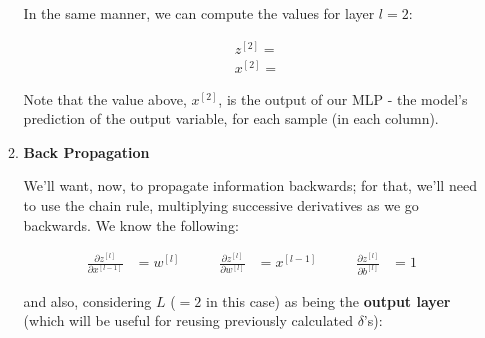 \documentclass[12pt]{article}
\begin{document}
\begin{enumerate}[leftmargin=\labelsep]
\begin{enumerate}
                In the same manner, we can compute the values for layer $l = 2$:

                \begin{equation*}
                  \begin{aligned}
                     & z^{[2]} =  \\
                     & x^{[2]} = 
                  \end{aligned}
                \end{equation*}

                Note that the value above, $x^{[2]}$, is the output of our MLP - the model's
                prediction of the output variable, for each sample (in each column).

                \pagebreak

          \item \textbf{Back Propagation}

                We'll want, now, to propagate information backwards; for that, we'll need to use
                the chain rule, multiplying successive derivatives as we go backwards.
                We know the following:

                \begin{equation*}
                  \begin{aligned}
                    \frac{\partial z^{[l]}}{\partial x^{[l - 1]}} & = w^{[l]}     & \qquad
                    \frac{\partial z^{[l]}}{\partial w^{[l]}}     & = x^{[l - 1]} & \qquad
                    \frac{\partial z^{[l]}}{\partial b^{[l]}}     & = 1
                  \end{aligned}
                \end{equation*}

                \vskip 0.5cm

                and also, considering $L$ ($=2$ in this case) as being the \textbf{output layer} (which will be useful for reusing previously calculated $\delta$'s):


\end{enumerate}
\end{enumerate}
\end{document}
